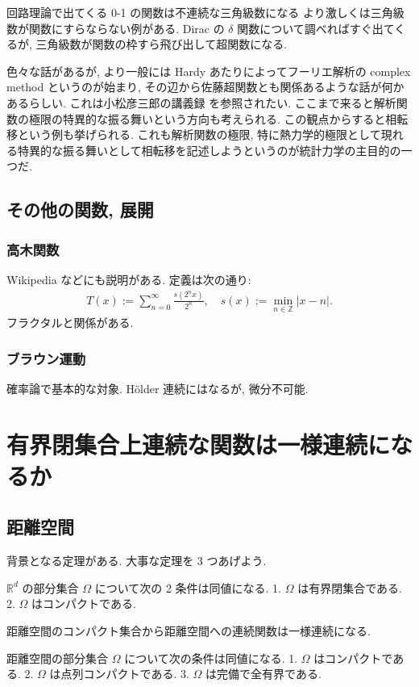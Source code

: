 \documentclass[openany, a4paper, oneside]{jsbook}
\begin{document}
回路理論で出てくる 0-1 の関数は不連続な三角級数になる
より激しくは三角級数が関数にすらならない例がある.
Dirac の $\delta$ 関数について調べればすぐ出てくるが, 三角級数が関数の枠すら飛び出して超関数になる.

色々な話があるが, より一般には Hardy あたりによってフーリエ解析の complex method というのが始まり,
その辺から佐藤超関数とも関係あるような話が何かあるらしい.
これは小松彦三郎の講義録 \cite{HikosaburoKomatsu1} を参照されたい.
ここまで来ると解析関数の極限の特異的な振る舞いという方向も考えられる.
この観点からすると相転移という例も挙げられる.
これも解析関数の極限, 特に熱力学的極限として現れる特異的な振る舞いとして相転移を記述しようというのが統計力学の主目的の一つだ.
\subsection{その他の関数, 展開}

\subsubsection{高木関数}

Wikipedia などにも説明がある.
定義は次の通り:
\begin{align}
 T (x)
 :=
 \sum_{n=0}^{\infty} \frac{s (2^n x)}{2^n}, \quad
 s (x)
 :=
 \min_{n \in \mathbb{Z}} | x - n |.
\end{align}
フラクタルと関係がある.
\subsubsection{ブラウン運動}

確率論で基本的な対象.
H\"older 連続にはなるが, 微分不可能.
\section{有界閉集合上連続な関数は一様連続になるか}

\subsection{距離空間}

背景となる定理がある.
大事な定理を 3 つあげよう.
\begin{thm}
 $\mathbb{R}^d$ の部分集合 $\Omega$ について次の 2 条件は同値になる.
 1. $\Omega$ は有界閉集合である.
 2. $\Omega$ はコンパクトである.
\end{thm}
\begin{thm}
 距離空間のコンパクト集合から距離空間への連続関数は一様連続になる.
\end{thm}
\begin{thm}
 距離空間の部分集合 $\Omega$ について次の条件は同値になる.
 1. $\Omega$ はコンパクトである.
 2. $\Omega$ は点列コンパクトである.
 3. $\Omega$ は完備で全有界である.
\end{thm}
\end{document}
